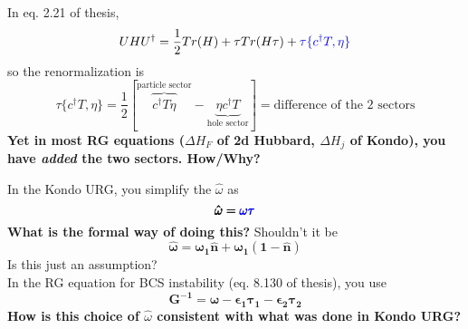 \documentclass[12pt,aspectratio=169]{beamer}
\newcommand{\qs}[1]{\textbf{\textcolor{bottlegreen}{#1}}}
\begin{document}
\begin{frame}
In eq. 2.21 of thesis,
\begin{equation*}
	U H U^\dagger = \frac{1}{2}Tr(H) + \tau Tr(H \tau) + \textcolor{blue}{\tau\{c^\dagger T,\eta\}}
\end{equation*}
so the renormalization is
\begin{equation*}
	\tau\{c^\dagger T,\eta\} = \frac{1}{2}\left[\overbrace{c^\dagger T \eta}^\text{particle sector} - \underbrace{\eta c^\dagger T}_\text{hole sector}\right] = \text{difference of the 2 sectors}
\end{equation*}
\qs{Yet in most RG equations (\(\Delta H_F\) of 2d Hubbard, \(\Delta H_j\) of Kondo), you have \textit{added} the two sectors. How/Why?}
\end{frame}
\begin{frame}
	In the Kondo URG, you simplify the \(\hat \omega\) as 
\begin{equation*}
	\pmb{\hat \omega = \textcolor{blue}{\omega \tau}}
\end{equation*}
\qs{What is the formal way of doing this?} Shouldn't it be 
\begin{equation*}
	\pmb{\hat \omega = \omega_1 \hat n + \omega_1 (1 - \hat n)}
\end{equation*}
Is this just an assumption?\\[10pt]
In the RG equation for BCS instability (eq. 8.130 of thesis), you use 
\begin{equation*}
	\pmb{G^{-1} = \omega - \epsilon_1 \tau_1 - \epsilon_2 \tau_2}
\end{equation*}
\qs{How is this choice of \(\hat \omega\) consistent with what was done in Kondo URG?}

\end{frame}
\end{document}
